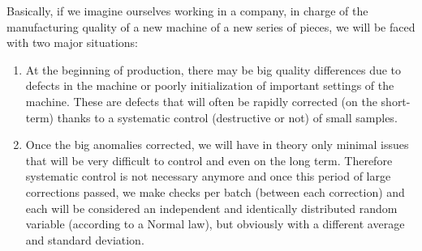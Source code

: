 Basically, if we imagine ourselves working in a company, in charge of the manufacturing quality of a new machine of a new series of pieces, we will be faced with two major situations:
	\begin{enumerate}
		\item At the beginning of production, there may be big quality differences due to defects in the machine or poorly initialization of important settings of the machine. These are defects that will often be rapidly corrected (on the short-term) thanks to a systematic control (destructive or not) of small samples. 
		
		\item Once the big anomalies corrected, we will have in theory only minimal issues that will be very difficult to control and even on the long term. Therefore systematic control is not necessary anymore and once this period of large corrections passed, we make checks per batch (between each correction) and each will be considered an independent and identically distributed random variable (according to a Normal law), but obviously with a different average and standard deviation.
	\end{enumerate}

